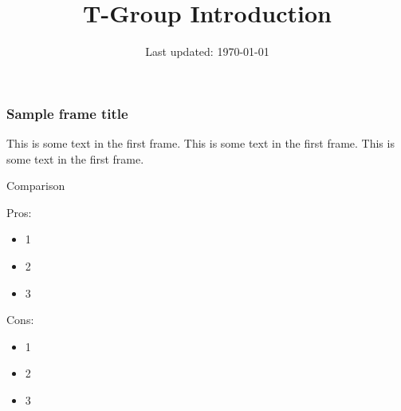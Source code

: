 \documentclass{beamer}
\title{T-Group Introduction}
\author{}
\institute{}
\date{Last updated: \today}
\begin{document}
\frame{\titlepage}

\begin{frame}
\frametitle{Sample frame title}
This is some text in the first frame. This is some text in the first frame. This is some text in the first frame.
\end{frame}


\begin{frame}{Comparison}
\pause
    \begin{minipage}[t]{0.48\linewidth}
        Pros:
        \begin{itemize}
            \item<3-> 1
            \item<4-> 2
            \item<5-> 3
        \end{itemize}
    \end{minipage}
    \hfill
    \begin{minipage}[t]{0.48\linewidth}%
        Cons:
        \begin{itemize}
            \item<3-> 1
            \item<4-> 2
            \item<5-> 3
        \end{itemize}
    \end{minipage}
\end{frame}
\end{document}
